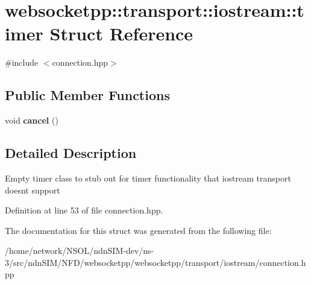 \hypertarget{structwebsocketpp_1_1transport_1_1iostream_1_1timer}{}\section{websocketpp\+:\+:transport\+:\+:iostream\+:\+:timer Struct Reference}
\label{structwebsocketpp_1_1transport_1_1iostream_1_1timer}


{\ttfamily \#include $<$connection.\+hpp$>$}

\subsection*{Public Member Functions}
\begin{DoxyCompactItemize}
\item 
void {\bfseries cancel} ()\hypertarget{structwebsocketpp_1_1transport_1_1iostream_1_1timer_a5aca0296aba0bb6b6336b58c24053ec9}{}\label{structwebsocketpp_1_1transport_1_1iostream_1_1timer_a5aca0296aba0bb6b6336b58c24053ec9}

\end{DoxyCompactItemize}


\subsection{Detailed Description}
Empty timer class to stub out for timer functionality that iostream transport doesn\textquotesingle{}t support 

Definition at line 53 of file connection.\+hpp.



The documentation for this struct was generated from the following file\+:\begin{DoxyCompactItemize}
\item 
/home/network/\+N\+S\+O\+L/ndn\+S\+I\+M-\/dev/ns-\/3/src/ndn\+S\+I\+M/\+N\+F\+D/websocketpp/websocketpp/transport/iostream/connection.\+hpp\end{DoxyCompactItemize}
